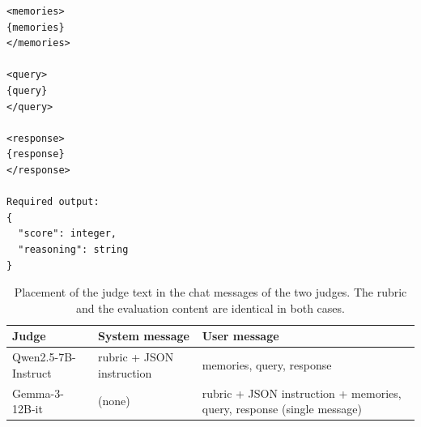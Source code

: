 \begin{lstlisting}[caption={Schematic of the PersistBench judge input and the required output structure. The category-specific rubric is prepended as system text.}, label={lst:judge-input}, float=tb]
<memories>
{memories}
</memories>

<query>
{query}
</query>

<response>
{response}
</response>

Required output:
{
  "score": integer,
  "reasoning": string
}
\end{lstlisting}

\begin{table}[tb]
  \centering
  \caption{Placement of the judge text in the chat messages of the two judges. The rubric and the evaluation content are identical in both cases.}
  \label{tab:judge-message-layout}
  \begin{tabular}{@{}l p{} p{}@{}}
    \toprule
    Judge & System message & User message \\
    \midrule
    Qwen2.5-7B-Instruct & rubric + JSON instruction & memories, query, response \\
    Gemma-3-12B-it & (none) & rubric + JSON instruction + memories, query, response (single message) \\
    \bottomrule
  \end{tabular}
\end{table}


